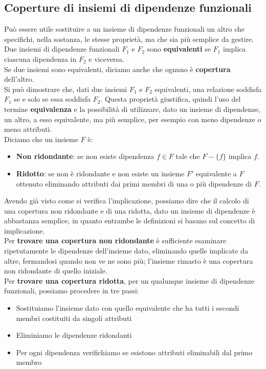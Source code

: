 \subsection{Coperture di insiemi di dipendenze funzionali}
Può essere utile sostituire a un insieme di dipendenze funzionali un altro che specifichi, nella sostanza, le stesse proprietà, ma che sia più semplice da gestire.\\
Due insiemi di dipendenze funzionali $F_1$ e $F_2$ sono \textbf{equivalenti} se $F_1$ implica ciascuna dipendenza in $F_2$ e viceversa.\\
Se due insiemi sono equivalenti, diciamo anche che ognuno è \textbf{copertura} dell'altro.\\
Si può dimostrare che, dati due insiemi $F_1$ e $F_2$ equivalenti, una relazione soddisfa $F_1$ se e solo se essa soddisfa $F_2$. Questa proprietà giustifica, quindi l'uso del termine \textbf{equivalenza} e la possibilità di utilizzare, dato un insieme di dipendenze, un altro, a esso equivalente, ma più semplice, per esempio con meno dipendenze o meno attributi.\\
Diciamo che un insieme $F$ è:
    \begin{itemize}
        \item{\textbf{Non ridondante}: se non esiste dipendenza $f \in F$ tale che $F - \{f\}$ implica $f$.}
        \item{\textbf{Ridotto}: se non è ridondante e non esiste un insieme $F'$ equivalente a $F$ ottenuto eliminando attributi dai primi membri di una o più dipendenze di $F$.}
    \end{itemize}
Avendo già visto come si verifica l'implicazione, possiamo dire che il calcolo di una copertura non ridondante e di una ridotta, dato un insieme di dipendenze è abbastanza semplice, in quanto entrambe le definizioni si basano sul concetto di implicazione.\\
Per \textbf{trovare una copertura non ridondante} è sufficiente esaminare ripetutamente le dipendenze dell'insieme dato, eliminando quelle implicate da altre, fermandosi quando non ve ne sono più; l'insieme rimasto è una copertura non ridondante di quello iniziale.\\
Per \textbf{trovare una copertura ridotta}, per un qualunque insieme di dipendenze funzionali, possiamo procedere in tre passi:
    \begin{itemize}
        \item{Sostituiamo l'insieme dato con quello equivalente che ha tutti i secondi membri costituiti da singoli attributi}
        \item{Eliminiamo le dipendenze ridondanti}
        \item{Per ogni dipendenza verifichiamo se esistono attributi eliminabili dal primo membro}
    \end{itemize}

